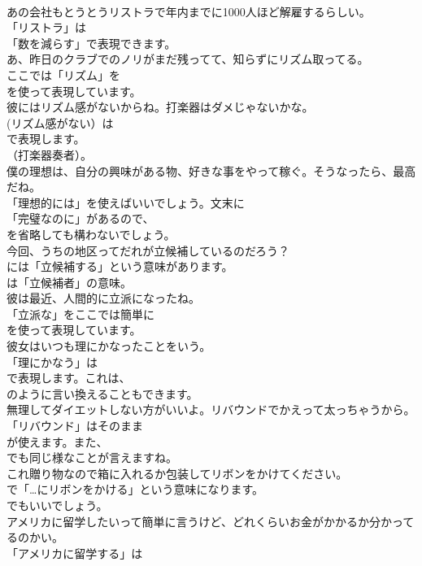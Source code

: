 \documentclass[8pt]{extreport}
\begin{document}
\begin{CJK}{UTF8}{min}
\\	あの会社もとうとうリストラで年内までに1000人ほど解雇するらしい。 
\\	「リストラ」は
\\	「数を減らす」で表現できます。	
\\	あ、昨日のクラブでのノリがまだ残ってて、知らずにリズム取ってる。 
\\	ここでは「リズム」を 
\\	を使って表現しています。	
\\	彼にはリズム感がないからね。打楽器はダメじゃないかな。 
\\	(リズム感がない）は
\\	で表現します。
\\	（打楽器奏者）。	
\\	僕の理想は、自分の興味がある物、好きな事をやって稼ぐ。そうなったら、最高だね。 
\\	「理想的には」を使えばいいでしょう。文末に
\\	「完璧なのに」があるので、
\\	を省略しても構わないでしょう。	
\\	今回、うちの地区ってだれが立候補しているのだろう？ 
\\	には「立候補する」という意味があります。
\\	は「立候補者」の意味。	
\\	彼は最近、人間的に立派になったね。 
\\	「立派な」をここでは簡単に
\\	を使って表現しています。	
\\	彼女はいつも理にかなったことをいう。 
\\	「理にかなう」は
\\	で表現します。これは、
\\	のように言い換えることもできます。	
\\	無理してダイエットしない方がいいよ。リバウンドでかえって太っちゃうから。 
\\	「リバウンド」はそのまま
\\	が使えます。また、
\\	でも同じ様なことが言えますね。	
\\	これ贈り物なので箱に入れるか包装してリボンをかけてください。 
\\	で「…にリボンをかける」という意味になります。
\\	でもいいでしょう。	
\\	アメリカに留学したいって簡単に言うけど、どれくらいお金がかかるか分かってるのかい。 
\\	「アメリカに留学する」は

\end{CJK}
\end{document}
